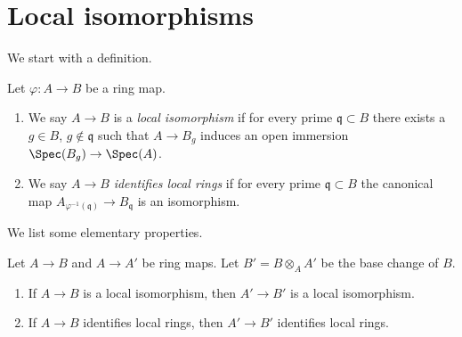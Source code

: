 
\section{Local isomorphisms}
\label{section-local-isomorphism}

\noindent
We start with a definition.

\begin{definition}
\label{definition-local-isomorphism}
Let $\varphi : A \to B$ be a ring map.
\begin{enumerate}
\item We say $A \to B$ is a {\it local isomorphism} if for every prime
$\mathfrak q \subset B$ there exists a $g \in B$, $g \not \in \mathfrak q$
such that $A \to B_g$ induces an open immersion $\Spec(B_g) \to \Spec(A)$.
\item We say $A \to B$ {\it identifies local rings} if for every prime
$\mathfrak q \subset B$ the canonical map
$A_{\varphi^{-1}(\mathfrak q)} \to B_\mathfrak q$ is an isomorphism.
\end{enumerate}
\end{definition}

\noindent
We list some elementary properties.

\begin{lemma}
\label{lemma-base-change-local-isomorphism}
Let $A \to B$ and $A \to A'$ be ring maps. Let $B' = B \otimes_A A'$
be the base change of $B$.
\begin{enumerate}
\item If $A \to B$ is a local isomorphism, then $A' \to B'$ is a
local isomorphism.
\item If $A \to B$ identifies local rings, then $A' \to B'$
identifies local rings.
\end{enumerate}
\end{lemma}

